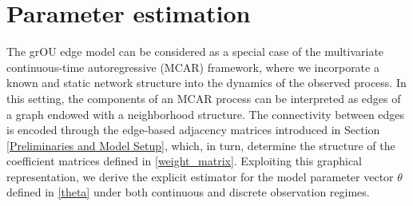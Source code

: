 \documentclass[12pt]{amsart}
\numberwithin{equation}{section}
\newcommand{\1}{\mathbf{1}}
\begin{document}
\section{Parameter estimation}
\label{Parameter Estimation}
The grOU edge model can be considered as a special case of the multivariate continuous-time autoregressive (MCAR) framework, where we incorporate a known and static network structure into the dynamics of the observed process. In this setting, the components of an MCAR process can be interpreted as edges of a graph endowed with a neighborhood structure. The connectivity between edges is encoded through the edge-based adjacency matrices introduced in Section \ref{Preliminaries and Model Setup}, which, in turn, determine the structure of the coefficient matrices defined in \eqref{weight_matrix}. Exploiting this graphical representation, we derive the explicit estimator for the model parameter vector $\theta$ defined in \eqref{theta} under both continuous and discrete observation regimes.
\end{document}
